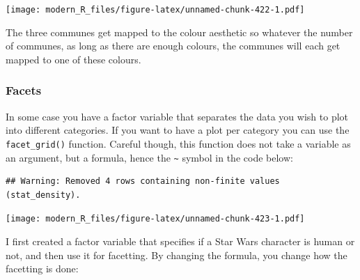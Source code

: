 \documentclass[]{gitbook}
\newenvironment{Shaded}{\begin{snugshade}}{\end{snugshade}}
\newcommand{\CommentTok}[1]{\textcolor[rgb]{0.56,0.35,0.01}{\textit{#1}}}
\newcommand{\DataTypeTok}[1]{\textcolor[rgb]{0.13,0.29,0.53}{#1}}
\newcommand{\KeywordTok}[1]{\textcolor[rgb]{0.13,0.29,0.53}{\textbf{#1}}}
\newcommand{\NormalTok}[1]{#1}
\newcommand{\OperatorTok}[1]{\textcolor[rgb]{0.81,0.36,0.00}{\textbf{#1}}}
\newcommand{\StringTok}[1]{\textcolor[rgb]{0.31,0.60,0.02}{#1}}
\begin{document}
\texttt{[image: modern\_R\_files/figure-latex/unnamed-chunk-422-1.pdf]}

The three communes get mapped to the colour aesthetic so whatever the number of communes, as long
as there are enough colours, the communes will each get mapped to one of these colours.

\hypertarget{facets}{%
\subsubsection{Facets}\label{facets}}

In some case you have a factor variable that separates the data you wish to plot into different
categories. If you want to have a plot per category you can use the \texttt{facet\_grid()} function.
Careful though, this function does not take a variable as an argument, but a formula, hence the \texttt{\textasciitilde{}}
symbol in the code below:

\begin{Shaded}
\end{Shaded}

\begin{verbatim}
## Warning: Removed 4 rows containing non-finite values (stat_density).
\end{verbatim}

\texttt{[image: modern\_R\_files/figure-latex/unnamed-chunk-423-1.pdf]}

I first created a factor variable that specifies if a Star Wars character is human or not, and then
use it for facetting. By changing the formula, you change how the facetting is done:
\end{document}

